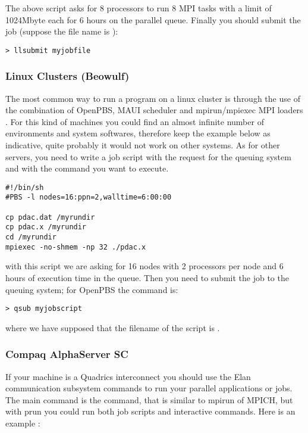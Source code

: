 The above script asks for 8 processors to run 8 MPI tasks
with a limit of 1024Mbyte each for 6 hours on the parallel queue.
Finally you should submit the job (suppose the file name is ):

\begin{verbatim}
> llsubmit myjobfile
\end{verbatim}

\subsubsection{Linux Clusters (Beowulf)}

The most common way to run a program on a linux cluster 
is through the use of the combination of OpenPBS, MAUI scheduler
and mpirun/mpiexec MPI loaders .
For this kind of machines you could find an almost infinite number
of environments and system softwares, therefore keep the example below
as indicative, quite probably it would not work on other systems. 
As for other servers, you need to write a job script with
the request for the queuing system and with the command you 
want to execute.

\begin{verbatim}
#!/bin/sh
#PBS -l nodes=16:ppn=2,walltime=6:00:00

cp pdac.dat /myrundir
cp pdac.x /myrundir
cd /myrundir
mpiexec -no-shmem -np 32 ./pdac.x
\end{verbatim}

with this script we are asking for 16 nodes with 2 processors per node
and 6 hours of execution time in the queue. Then you need to
submit the job to the queuing system; for OpenPBS the command is:

\begin{verbatim}
> qsub myjobscript
\end{verbatim}

where we have supposed that the filename of the script is
.

\subsubsection{Compaq AlphaServer SC}

If your machine is a Quadrics interconnect you should use the 
Elan communication subsystem commands to run your parallel applications
or jobs. The main command is the  command, that is similar
to mpirun of MPICH, but with prun you could run both job scripts
and interactive commands. Here is an example :

